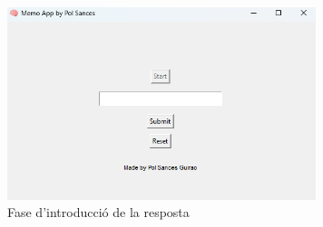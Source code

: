\begin{figure}[h!]
    \centering
    \includegraphics[width=9cm]{img/figures/app-fase3.png}
    \caption{Fase d'introducció de la resposta}
    \label{fig:fase-resp}
\end{figure}
